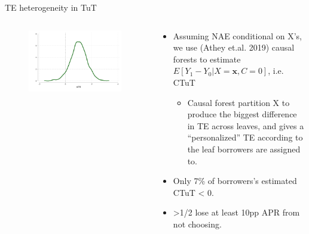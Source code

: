 \documentclass[9pt, aspectratio=169]{beamer}
\begin{document}
\begin{frame}{TE heterogeneity in TuT}

\begin{columns}
\begin{column}{.43\textwidth}
\begin{figure}    
\centering
\includegraphics[width=0.99\textwidth]{Figuras/he_dist_tau_hat_tut.pdf}
\end{figure}
\end{column}
\begin{column}{.5\textwidth}
   \begin{itemize}
     \item Assuming NAE conditional on X's, we use (Athey et.al. 2019) causal forests to estimate $E[Y_1 - Y_0| X = \mathbf{x}, C = 0]$, i.e. CTuT
     \vspace{.1in}
     \begin{itemize}
	 \item Causal forest partition X to produce the biggest difference in TE across leaves, and gives a ``personalized'' TE according to the leaf borrowers are assigned to.
    \end{itemize}
    \vspace{.2in}
    \item Only 7\% of borrowers's estimated CTuT < 0.
    \vspace{.2in}
    \item >1/2 lose at least 10pp APR from not choosing.
    \end{itemize}
\end{column}
\end{columns}
\end{frame}
\end{document}
